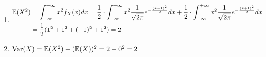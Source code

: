 \begin{enumerate}
\begin{enumerate}
\item  \begin{align*}
\operatorname{\mathbb{E}}(X^2) &= \int_{-\infty}^{+\infty} x^2 f_X (x) dx  =
\frac{1}{2} \cdot \int_{-\infty}^{+\infty} x^2 \frac{1}{\sqrt{2\pi}} e^{-\frac{(x-1)^2}{2}} dx  +
\frac{1}{2}  \cdot \int_{-\infty}^{+\infty} x^2 \frac{1}{\sqrt{2\pi}} e^{-\frac{(x+1)^2}{2}} dx \\
&= \frac{1}{2}(1^2 + 1^2 + (-1)^2 + 1^2) =  2
\end{align*}
\item $\operatorname{Var}(X) = \operatorname{\mathbb{E}}(X^2) - (\operatorname{\mathbb{E}}(X))^2 = 2 - 0^2 = 2$
\end{enumerate}
\end{enumerate}
